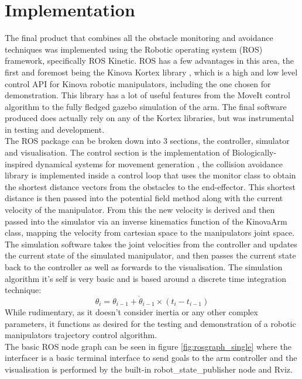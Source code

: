 \documentclass[a4paper, 11.5pt, conference]{ieeeconf}      %
\begin{document}
\section{Implementation} 
The final product that combines all the obstacle monitoring and avoidance techniques was implemented using the Robotic operating system (ROS) framework, specifically ROS Kinetic. ROS has a few advantages in this area, the first and foremost being the Kinova Kortex library \cite{kortex}, which is a high and low level control API for Kinova robotic manipulators, including the one chosen for demonstration. This library has a lot of useful features from the MoveIt control algorithm to the fully fledged gazebo simulation of the arm. The final software produced does actually rely on any of the Kortex libraries, but was instrumental in testing and development. \\

The ROS package can be broken down into 3 sections, the controller, simulator and visualisation. The control section is the implementation of Biologically-inspired dynamical systems for movement generation \cite{Hoffmann}, the collision avoidance library is implemented inside a control loop that uses the monitor class to obtain the shortest distance vectors from the obstacles to the end-effector. This shortest distance is then passed into the potential field method along with the current velocity of the manipulator. From this the new velocity is derived and then passed into the simulator via an inverse kinematics function of the KinovaArm class, mapping the velocity from cartesian space to the manipulators joint space. \\

The simulation software takes the joint velocities from the controller and updates the current state of the simulated manipulator, and then passes the current state back to the controller as well as forwards to the visualisation. The simulation algorithm it's self is very basic and is based around a discrete time integration technique:
$$
\theta_i = \theta_{i-1} + \dot{\theta}_{i-1}\times (t_i - t_{i-1})
$$ 
While rudimentary, as it doesn't consider inertia or any other complex parameters, it functions as desired for the testing and demonstration of a robotic manipulators trajectory control algorithm. \\

The basic ROS node graph can be seen in figure \ref{fig:rosgraph_single} where the interfacer is a basic terminal interface to send goals to the arm controller and the visualisation is performed by the built-in robot\_state\_publisher node and Rviz.
\end{document}
